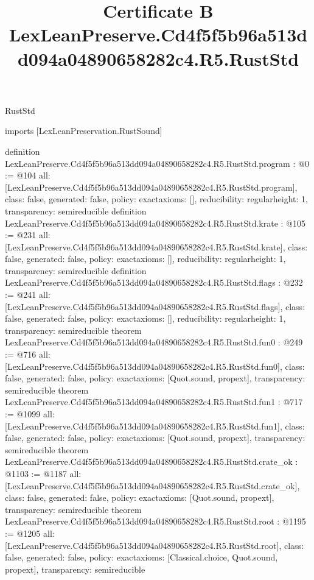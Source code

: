 \begin{lexlean}{RustStd}
\title{Certificate B LexLeanPreserve.Cd4f5f5b96a513dd094a04890658282c4.R5.RustStd}
\begin{coremodule}
imports [LexLeanPreservation.RustSound]

definition LexLeanPreserve.Cd4f5f5b96a513dd094a04890658282c4.R5.RustStd.program : @0 := @104 {
  all: [LexLeanPreserve.Cd4f5f5b96a513dd094a04890658282c4.R5.RustStd.program],
  class: false,
  generated: false,
  policy: exact{axioms: []},
  reducibility: regular{height: 1},
  transparency: semireducible
}
definition LexLeanPreserve.Cd4f5f5b96a513dd094a04890658282c4.R5.RustStd.krate : @105 := @231 {
  all: [LexLeanPreserve.Cd4f5f5b96a513dd094a04890658282c4.R5.RustStd.krate],
  class: false,
  generated: false,
  policy: exact{axioms: []},
  reducibility: regular{height: 1},
  transparency: semireducible
}
definition LexLeanPreserve.Cd4f5f5b96a513dd094a04890658282c4.R5.RustStd.flags : @232 := @241 {
  all: [LexLeanPreserve.Cd4f5f5b96a513dd094a04890658282c4.R5.RustStd.flags],
  class: false,
  generated: false,
  policy: exact{axioms: []},
  reducibility: regular{height: 1},
  transparency: semireducible
}
theorem LexLeanPreserve.Cd4f5f5b96a513dd094a04890658282c4.R5.RustStd.fun0 : @249 := @716 {
  all: [LexLeanPreserve.Cd4f5f5b96a513dd094a04890658282c4.R5.RustStd.fun0],
  class: false,
  generated: false,
  policy: exact{axioms: [Quot.sound, propext]},
  transparency: semireducible
}
theorem LexLeanPreserve.Cd4f5f5b96a513dd094a04890658282c4.R5.RustStd.fun1 : @717 := @1099 {
  all: [LexLeanPreserve.Cd4f5f5b96a513dd094a04890658282c4.R5.RustStd.fun1],
  class: false,
  generated: false,
  policy: exact{axioms: [Quot.sound, propext]},
  transparency: semireducible
}
theorem LexLeanPreserve.Cd4f5f5b96a513dd094a04890658282c4.R5.RustStd.crate_ok : @1103 := @1187 {
  all: [LexLeanPreserve.Cd4f5f5b96a513dd094a04890658282c4.R5.RustStd.crate_ok],
  class: false,
  generated: false,
  policy: exact{axioms: [Quot.sound, propext]},
  transparency: semireducible
}
theorem LexLeanPreserve.Cd4f5f5b96a513dd094a04890658282c4.R5.RustStd.root : @1195 := @1205 {
  all: [LexLeanPreserve.Cd4f5f5b96a513dd094a04890658282c4.R5.RustStd.root],
  class: false,
  generated: false,
  policy: exact{axioms: [Classical.choice, Quot.sound, propext]},
  transparency: semireducible
}


\end{coremodule}
\end{lexlean}
